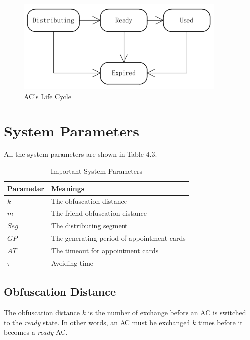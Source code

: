 \begin{figure} [hbtp]
  \centering 
  \includegraphics[width=4.0in]{figures/aclifecycle.png}
  \caption{AC's Life Cycle} 
  \label{fig:ACLifeCycle} %
\end{figure}

\section{ System Parameters}

\noindent All the system parameters are shown in Table 4.3. 

\begin{table} [hbtp]
\caption{Important System Parameters}
\label{table:ImptACSysParam}
\centering
\tabulinesep=2mm
\begin{tabu} to 110 mm {|X[1,c]|X[4,l]|} \hline 
Parameter & Meanings \\ \hline 
$k$ & The obfuscation distance \\ \hline 
$m$ & The friend obfuscation distance \\ \hline 
$Seg$ & The distributing segment \\ \hline 
$GP$ & The generating period of appointment cards \\ \hline 
$AT$ & The timeout for appointment cards \\ \hline 
$\tau$ & Avoiding time \\ \hline 
\end{tabu}
\end{table}

\subsection{ Obfuscation Distance}

\noindent The obfuscation distance $k$ is the number of exchange before an AC is switched to the \textit{ready} state. In other words, an AC must be exchanged $k$ times before it becomes a \textit{ready}-AC.

